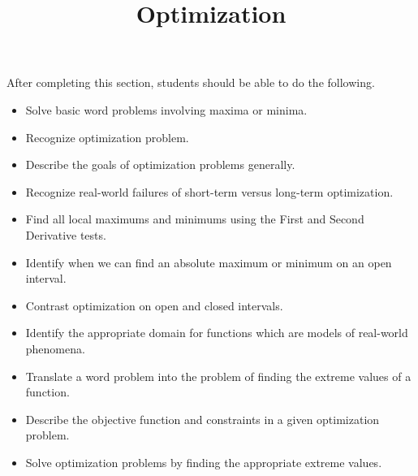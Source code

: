 \documentclass{ximera}
\title{Optimization}
\begin{document}
\begin{abstract}
\end{abstract}

\maketitle

\begin{sectionOutcomes}

After completing this section, students should be able to do the following.

\begin{itemize}
	\item Solve basic word problems involving maxima or minima.
	\item Recognize optimization problem.
        \item Describe the goals of optimization problems generally.
        \item Recognize real-world failures of short-term versus long-term optimization.
	\item Find all local maximums and minimums using the First and Second Derivative tests.
	\item Identify when we can find an absolute maximum or minimum on an open interval.
	\item Contrast optimization on open and closed intervals.
        \item Identify the appropriate domain for functions which are models of real-world phenomena. 
        \item Translate a word problem into the problem of finding the extreme values of a function.
	\item Describe the objective function and constraints in a given optimization problem.
	\item Solve optimization problems by finding the appropriate extreme values.
\end{itemize}

\end{sectionOutcomes}
\end{document}
